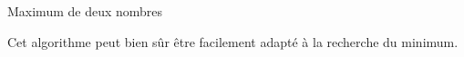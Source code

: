 \begin{Fiche}{Maximum de deux nombres}

	

	Cet algorithme peut bien sûr être facilement adapté
	à la recherche du minimum.
		
\end{Fiche}
